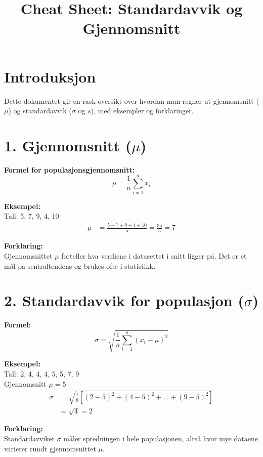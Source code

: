 \documentclass[a4paper,12pt]{article}
\title{Cheat Sheet: Standardavvik og Gjennomsnitt}
\author{}
\date{}
\begin{document}
\maketitle

\section*{Introduksjon}
Dette dokumentet gir en rask oversikt over hvordan man regner ut gjennomsnitt ($\mu$) og standardavvik ($\sigma$ og $s$), med eksempler og forklaringer.

\section*{1. Gjennomsnitt ($\mu$)}
\textbf{Formel for populasjonsgjennomsnitt:}
\begin{equation}
\mu = \frac{1}{n} \sum_{i=1}^{n} x_i
\end{equation}

\textbf{Eksempel:}\\
Tall: 5, 7, 9, 4, 10\\
\begin{align*}
\mu &= \frac{5 + 7 + 9 + 4 + 10}{5} = \frac{35}{5} = 7
\end{align*}

\textbf{Forklaring:}\\
Gjennomsnittet $\mu$ forteller hva verdiene i datasettet i snitt ligger på. Det er et mål på sentraltendens og brukes ofte i statistikk.

\section*{2. Standardavvik for populasjon ($\sigma$)}
\textbf{Formel:}
\begin{equation}
\sigma = \sqrt{ \frac{1}{n} \sum_{i=1}^{n} (x_i - \mu)^2 }
\end{equation}

\textbf{Eksempel:}\\
Tall: 2, 4, 4, 4, 5, 5, 7, 9\\
Gjennomsnitt $\mu = 5$\\
\begin{align*}
\sigma &= \sqrt{ \frac{1}{8} \left[(2-5)^2 + (4-5)^2 + \dots + (9-5)^2 \right] } \\
       &= \sqrt{4} = 2
\end{align*}

\textbf{Forklaring:}\\
Standardavviket $\sigma$ måler spredningen i hele populasjonen, altså hvor mye dataene varierer rundt gjennomsnittet $\mu$.
\end{document}
